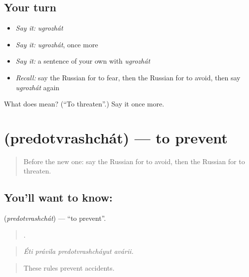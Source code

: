\subsection*{Your turn}
\begin{itemize}
\raggedright
  \item \emph{Say it:} \emph{ugrozhát}
  \item \emph{Say it:} \emph{ugrozhát}, once more
  \item \emph{Say it:} a sentence of your own with \emph{ugrozhát}
  \item \emph{Recall:} say the Russian for to fear, then the Russian for to avoid, then say \emph{ugrozhát} again
\end{itemize}

\begin{tcolorbox}[breakable,colback=teal!4,colframe=teal!35!black,title={Before you move on}]
What does  mean? (\textquotedblleft{}To threaten\textquotedblright{}.) Say it once more.
\end{tcolorbox}
\section[\texorpdfstring{\ru{предотвращать} (predotvrashchát)}{предотвращать (predotvrashchát)}]{ (predotvrashchát) — to prevent}

\label{lesson:RU-C373-predotvrashchat}



\begin{quote}
Before the new one: say the Russian for to avoid, then the Russian for to threaten.
\end{quote}

\subsection*{You'll want to know: }
\textbf{} (\emph{predotvrashchát}) — \textquotedblleft{}to prevent\textquotedblright{}.

\begin{quote}
   .
\end{quote}

\begin{quote}
\emph{Éti právila predotvrashcháyut avárii.}
\end{quote}

\begin{quote}
These rules prevent accidents.
\end{quote}

